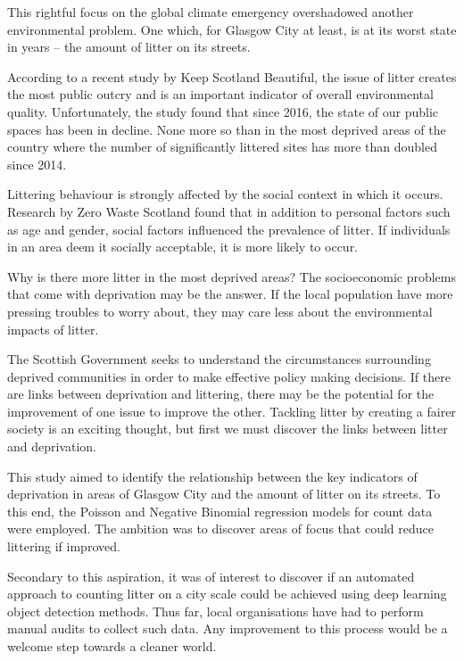 \documentclass{thesis}
\begin{document}
This rightful focus on the global climate emergency overshadowed another environmental problem. One which, for Glasgow City at least, is at its worst state in years\cite{tackle-litter} -- the amount of litter on its streets.

According to a recent study by Keep Scotland Beautiful, the issue of litter creates the most public outcry\cite{household-survey-2019} and is an important indicator of overall environmental quality. Unfortunately, the study found that since 2016, the state of our public spaces has been in decline. None more so than in the most deprived areas of the country where the number of significantly littered sites has more than doubled since 2014.

Littering behaviour is strongly affected by the social context in which it occurs\cite{littering-behaviour}. Research by Zero Waste Scotland found that in addition to personal factors such as age and gender, social factors influenced the prevalence of litter. If individuals in an area deem it socially acceptable, it is more likely to occur. 

Why is there more litter in the most deprived areas? The socioeconomic problems that come with deprivation may be the answer. If the local population have more pressing troubles to worry about, they may care less about the environmental impacts of litter.

The Scottish Government seeks to understand the circumstances  surrounding deprived communities in order to make effective policy making decisions. If there are links between deprivation and littering, there may be the potential for the improvement of one issue to improve the other. Tackling litter by creating a fairer society is an exciting thought, but first we must discover the links between litter and deprivation.

This study aimed to identify the relationship between the key indicators of deprivation in areas of Glasgow City and the amount of litter on its streets. To this end, the Poisson and Negative Binomial regression models for count data were employed. The ambition was to discover areas of focus that could reduce littering if improved.

Secondary to this aspiration, it was of interest to discover if an automated approach to counting litter on a city scale could be achieved using deep learning object detection methods. Thus far, local organisations have had to perform manual audits to collect such data. Any improvement to this process would be a welcome step towards a cleaner world.
\end{document}
